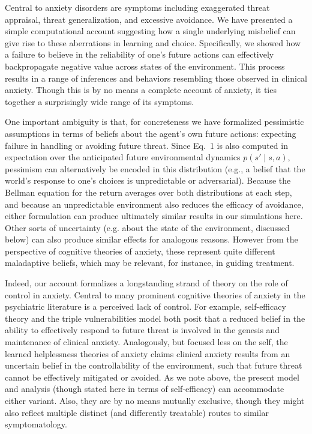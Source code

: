 \documentclass[11pt]{article} %
\begin{document}
Central to anxiety disorders are symptoms including exaggerated threat appraisal, threat generalization, and excessive avoidance. We have presented a simple computational account suggesting how a single underlying misbelief can give rise to these aberrations in learning and choice. Specifically, we showed how a failure to believe in the reliability of one's future actions can effectively backpropagate negative value across states of the environment. This process results in a range of inferences and behaviors resembling those observed in clinical anxiety. Though this is by no means a complete account of anxiety, it ties together a surprisingly wide range of its symptoms.

One important ambiguity is that, for concreteness we have formalized pessimistic assumptions in terms of beliefs about the agent's own future actions: expecting failure in handling or avoiding future threat. Since Eq.~1 is also computed in expectation over the anticipated future environmental dynamics $p(s' \mid s,a)$, pessimism can alternatively be encoded in this distribution (e.g., a belief that the world's response to one's choices is unpredictable or adversarial). Because the Bellman equation for the return averages over both distributions at each step, and because an unpredictable environment also reduces the efficacy of avoidance, either formulation can produce ultimately similar results in our simulations here. Other sorts of uncertainty (e.g. about the state of the environment, discussed below) can also produce similar effects for analogous reasons. However from the perspective of cognitive theories of anxiety, these represent quite different maladaptive beliefs, which may be relevant, for instance, in guiding treatment.

Indeed, our account formalizes a longstanding strand of theory on the role of control in anxiety. Central to many prominent cognitive theories of anxiety in the psychiatric literature is a perceived lack of control. For example, self-efficacy theory\citep{bandura1977} and the triple vulnerabilities model\citep{barlow2002} both posit that a reduced belief in the ability to effectively respond to future threat is involved in the genesis and maintenance of clinical anxiety. Analogously, but focused less on the self, the learned helplessness theories of anxiety\cite{alloy1990} claims clinical anxiety results from an uncertain belief in the controllability of the environment, such that future threat cannot be effectively mitigated or avoided. As we note above, the present model and analysis (though stated here in terms of self-efficacy) can accommodate either variant. Also, they are by no means mutually exclusive, though they might also reflect multiple distinct (and differently treatable) routes to similar symptomatology.
\end{document}
